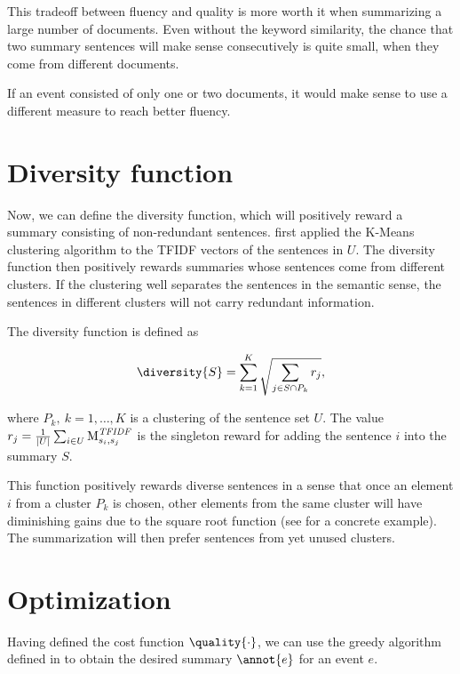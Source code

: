This tradeoff between fluency and quality is more worth it when summarizing a large number of documents. Even without the keyword similarity, the chance that two summary sentences will make sense consecutively is quite small, when they come from different documents.

If an event consisted of only one or two documents, it would make sense to use a different measure to reach better fluency.

\section{Diversity function}
Now, we can define the diversity function, which will positively reward a summary consisting of non-redundant sentences. \cite{multi-summarization-2} first applied the K-Means clustering algorithm to the TFIDF vectors of the sentences in $U$. The diversity function then positively rewards summaries whose sentences come from different clusters. If the clustering well separates the sentences in the semantic sense, the sentences in different clusters will not carry redundant information.

The diversity function is defined as

\begin{equation} \label{eq:diversity}
	\diversity{S} = \sum_{k = 1}^{K} \sqrt{\sum_{j \in S \cap P_{k}} r_{j}},
\end{equation}

where $P_{k},\ k = 1, \dots, K$ is a clustering of the sentence set $U$. The value $r_{j} = \frac{1}{\left| U \right|} \sum_{i \in U} \text{M}_{s_{i}, s_{j}}^{\mathit{TFIDF}}$ is the singleton reward for adding the sentence $i$ into the summary $S$.

This function positively rewards diverse sentences in a sense that once an element $i$ from a cluster $P_{k}$ is chosen, other elements from the same cluster will have diminishing gains due to the square root function (see \cite{multi-summarization-2} for a concrete example). The summarization will then prefer sentences from yet unused clusters.


\section{Optimization}
Having defined the cost function $\quality{\cdot}$, we can use the greedy algorithm defined in \cite{multi-summarization-1} to obtain the desired summary $\annot{e}$ for an event $e$.

